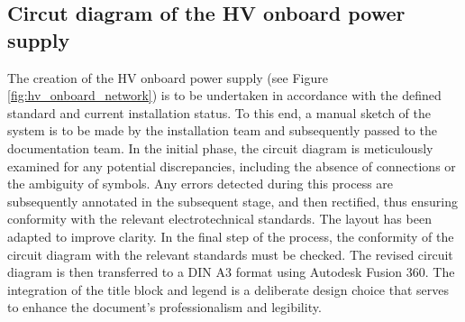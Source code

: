 %

\subsection{Circut diagram of the HV onboard power supply}

The creation of the HV onboard power supply (see Figure \ref{fig:hv_onboard_network}) is to be undertaken in accordance with the defined standard and current installation status. To this end, a manual sketch of the system is to be made by the installation team and subsequently passed to the documentation team. In the initial phase, the circuit diagram is meticulously examined for any potential discrepancies, including the absence of connections or the ambiguity of symbols. Any errors detected during this process are subsequently annotated in the subsequent stage, and then rectified, thus ensuring conformity with the relevant electrotechnical standards. The layout has been adapted to improve clarity. In the final step of the process, the conformity of the circuit diagram with the relevant standards must be checked. The revised circuit diagram is then transferred to a DIN A3 format using Autodesk Fusion 360. The integration of the title block and legend is a deliberate design choice that serves to enhance the document's professionalism and legibility.

